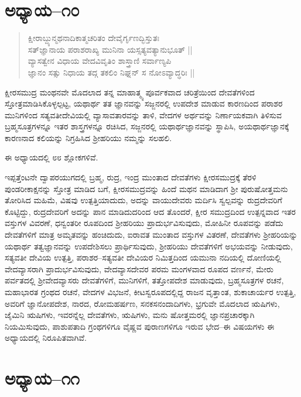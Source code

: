 \section{ಅಧ್ಯಾಯ–೧೦}

\begin{verse}
ಕ್ಷೀರಾಬ್ದ್ಯುನ್ಮಥನಾದಿಕಾತ್ಮಚರಿತಂ ದೇವೈರ್ಗೃಣದ್ಭಿಸ್ತುತಃ \\ ಸತ್‌ಜ್ಞಾನಾಯ ಪರಾಶರಾಖ್ಯ ಮುನಿನಾ ಯಸ್ಸತ್ಯವತ್ಯಾನುಭೂತ್ || \\ ವ್ಯಾಸತ್ವೇನ ವಿಧಾಯ ವೇದವಿವೃತಿಂ ಶಾಸ್ತ್ರಾಣಿ ಸರ್ವಾಣ್ಯಪಿ\\ ಜ್ಞಾನಂ ಸತ್ಸು ನಿಧಾಯ ತದ್ಗ ತಕಲಿಂ ನಿಘ್ನನ್ ಸ ನೋಽವ್ಯಾದ್ಧರಿಃ ||
\end{verse}

ಕ್ಷೀರಸಮುದ್ರ ಮಂಥನವೇ ಮೊದಲಾದ ತನ್ನ ಮಾಹಾತ್ಮ್ಯ ಪೂರ್ವಕವಾದ ಚರಿತ್ರೆಯಿಂದ ದೇವತೆಗಳಿಂದ ಸ್ತೋತ್ರಮಾಡಿಸಿಕೊಳ್ಳಲ್ಪಟ್ಟ, ಯಥಾರ್ಥ ತತ ಜ್ಞಾನವನ್ನು ಸಜ್ಜನರಲ್ಲಿ ಉಪದೇಶ ಮಾಡುವ ಕಾರಣದಿಂದ ಪರಾಶರ ಮುನಿಗಳಿಂದ ಸತ್ಯವತೀದೇವಿಯಲ್ಲಿ ವ್ಯಾಸಾವತಾರವನ್ನು ತಾಳಿ, ವೇದಗಳ ಅರ್ಥವನ್ನು ನಿರ್ಣಾಯಕವಾಗಿ ತಿಳಿಸುವ ಬ್ರಹ್ಮಸೂತ್ರಗಳನ್ನೂ ಇತರ ಶಾಸ್ತ್ರಗಳನ್ನೂ ರಚಿಸಿದ, ಸಜ್ಜನರಲ್ಲಿ ಯಥಾರ್ಥಜ್ಞಾನವನ್ನು ಸ್ಥಾಪಿಸಿ, ಅಯಥಾರ್ಥಜ್ಞಾನಕ್ಕೆ ಕಾರಣನಾದ ಕಲಿಯನ್ನು ನಿಗ್ರಹಿಸಿದ ಶ‍್ರೀಹರಿಯು ನಮ್ಮನ್ನು ಸಲಹಲಿ.

ಈ ಅಧ್ಯಾಯದಲ್ಲಿ ೮೮ ಶ್ಲೋಕಗಳಿವೆ.

ಇಪ್ಪತ್ತೆಂಟನೇ ದ್ವಾಪರಯುಗದಲ್ಲಿ ಬ್ರಹ್ಮ, ರುದ್ರ, ಇಂದ್ರ ಮುಂತಾದ ದೇವತೆಗಳು ಕ್ಷೀರಸಮುದ್ರಕ್ಕೆ ತೆರಳಿ ಪುಂಡರೀಕಾಕ್ಷನನ್ನು ಸ್ತೋತ್ರ ಮಾಡಿದ ಬಗೆ, ಕ್ಷೀರಸಮುದ್ರವನ್ನು ಹಿಂದೆ ಮಥನ ಮಾಡಿದಾಗ ಶ‍್ರೀ ಪುರುಷೋತ್ತಮನು ತೋರಿಸಿದ ಮಹಿಮೆ, ವಿಷವು ಉತ್ಪತ್ತಿಯಾದುದು, ಅದನ್ನು ವಾಯುದೇವರು ಮರ್ದಿಸಿ ಸ್ವಲ್ಪವನ್ನು ರುದ್ರದೇವರಿಗೆ ಕೊಟ್ಟಿದ್ದು, ರುದ್ರದೇವರಿಗೆ ಅದನ್ನು ಪಾನ ಮಾಡಿದುದರಿಂದ ಆದ ತೊಂದರೆ, ಕ್ಷೀರ ಸಮುದ್ರದಿಂದ ಉತ್ಪನ್ನವಾದ ಇತರ ವಸ್ತುಗಳ ವಿವರಣೆ, ಧನ್ವಂತರೀ ರೂಪದಿಂದ ಶ‍್ರೀಹರಿಯು ಪ್ರಾದುರ್ಭವಿಸುವುದು, ಮೋಹಿನೀ ರೂಪವನ್ನು ಪಡೆದು ದೇವತೆಗಳಿಗೆ ಮಾತ್ರ ಅಮೃತವನ್ನು ಹಂಚಿದುದು, ಐರಾವತ ಮುಂತಾದ ವಸ್ತುಗಳ ವಿತರಣೆ, ದೇವತೆಗಳು ಶ‍್ರೀಹರಿಯನ್ನು ಯಥಾರ್ಥ ತತ್ವಜ್ಞಾನವನ್ನು ಉಪದೇಶಿಸಲು ಪ್ರಾರ್ಥಿಸುವುದು, ಶ‍್ರೀಹರಿಯು ದೇವತೆಗಳಿಗೆ ಅಭಯವನ್ನು ನೀಡುವುದು, ಸತ್ಯವತೀ ದೇವಿಯ ಉತ್ಪತ್ತಿ, ಪರಾಶರ–ಸತ್ಯವತೀ ದೇವಿಯರ ನಿಮಿತ್ತದಿಂದ ಯಮುನಾ ನದಿಯಲ್ಲಿ ದೋಣಿಯಲ್ಲಿ ವೇದವ್ಯಾಸರಾಗಿ ಪ್ರಾದುರ್ಭವಿಸುವುದು, ವೇದವ್ಯಾಸದೇವರ ಪರಮ ಮಂಗಳವಾದ ರೂಪದ ವರ್ಣನೆ, ಮೇರು ಪರ್ವತದಲ್ಲಿ ಶ‍್ರೀವೇದವ್ಯಾಸರು ದೇವತೆಗಳಿಗೆ, ಮುನಿಗಳಿಗೆ, ತತ್ತೋಪದೇಶ ಮಾಡುವುದು, ಬ್ರಹ್ಮಸೂತ್ರಗಳ ರಚನೆ, ಮಹಾಭಾರತ ಗ್ರಂಥದ ರಚನೆ, ವೇದಗಳ ವಿಭಜನೆ, ಕೀಟಸ್ವರೂಪದಲ್ಲಿದ್ದ ರಾಜನ ವೃತ್ತಾಂತ, ಶುಕಾಚಾರ್ಯರ ಉತ್ಪತ್ತಿ, ಅವರಿಗೆ ಜ್ಞಾನೋಪದೇಶ, ನಾರದ, ರೋಮಹರ್ಷಣ, ಸನಕಸನಂದಾದಿಗಳು, ಭ್ರಗುವೇ ಮೊದಲಾದ ಋಷಿಗಳು, ಜೈಮಿನಿ ಋಷಿಗಳು, ಇವರನ್ನೆಲ್ಲ ದೇವತೆಗಳು, ಋಷಿಗಳು, ಮನು ಷೋತ್ತಮರಲ್ಲಿ ಜ್ಞಾನಪ್ರಚಾರಕ್ಕಾಗಿ ನಿಯಮಿಸುವುದು, ಪಾಶುಪತಾದಿ ಗ್ರಂಥಗಳಿಗೂ ವೈಷ್ಣವ ಪುರಾಣಗಳಿಗೂ ಇರುವ ಭೇದ–ಈ ವಿಷಯಗಳು ಈ ಅಧ್ಯಾಯದಲ್ಲಿ ನಿರೂಪಿತವಾಗಿವೆ.


\section{ಅಧ್ಯಾಯ–೧೧}

